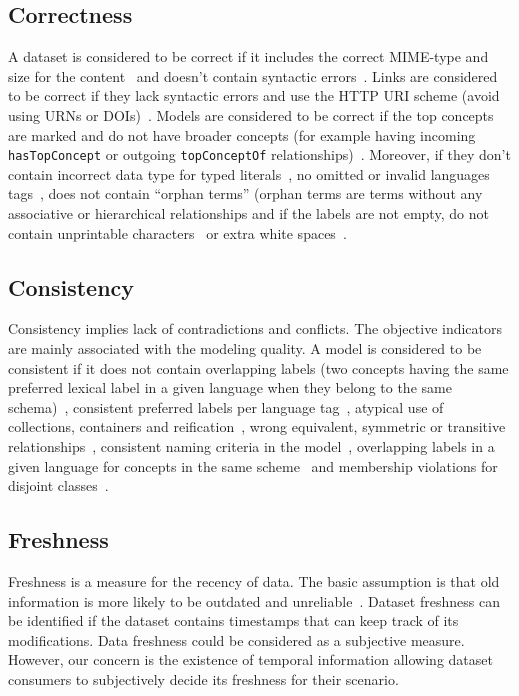 \subsection{Correctness}
A dataset is considered to be correct if it includes the correct MIME-type and size for the content~\cite{Hogan:LDOW:10} and doesn't contain syntactic errors~\cite{Hogan:LDOW:10}. Links are considered to be correct if they lack syntactic errors and use the HTTP URI scheme (avoid using URNs or DOIs)~\cite{Mader:TBDL:12}. Models are considered to be correct if the top concepts are marked and do not have broader concepts (for example having incoming \texttt{hasTopConcept} or outgoing \texttt{topConceptOf} relationships)~\cite{Mader:TBDL:12}. Moreover, if they don't contain incorrect data type for typed literals~\cite{Hogan:LDOW:10}\cite{Acosta:ISWC:13}, no omitted or invalid languages tags~\cite{Suominen:IKEM:12,Mader:TBDL:12}, does not contain ``orphan terms'' (orphan terms are terms without any associative or hierarchical relationships and if the labels are not empty, do not contain unprintable characters~\cite{Acosta:ISWC:13,Mader:TBDL:12} or extra white spaces~\cite{Suominen:IKEM:12}.

\subsection{Consistency}
Consistency implies lack of contradictions and conflicts. The objective indicators are mainly associated with the modeling quality. A model is considered to be consistent if it does not contain overlapping labels (two concepts having the same preferred lexical label in a given language when they belong to the same schema)~\cite{Isaac:W3C:09,Mader:TBDL:12}, consistent preferred labels per language tag~\cite{Mader:TBDL:12,Suominen:IKEM:12}, atypical use of collections, containers and reification~\cite{Hogan:LDOW:10}, wrong equivalent, symmetric or transitive relationships~\cite{Maria:KEOD:13}, consistent naming criteria in the model~\cite{Mader:TBDL:12,Maria:KEOD:13}, overlapping labels in a given language for concepts in the same scheme~\cite{Mader:TBDL:12} and membership violations for disjoint classes~\cite{Hogan:LDOW:10,Maria:KEOD:13}.

\subsection{Freshness}
Freshness is a measure for the recency of data. The basic assumption is that old information is more likely to be outdated and unreliable~\cite{Flouris:EvoDyn:12}. Dataset freshness can be identified if the dataset contains timestamps that can keep track of its modifications. Data freshness could be considered as a subjective measure. However, our concern is the existence of temporal information allowing dataset consumers to subjectively decide its freshness for their scenario.

